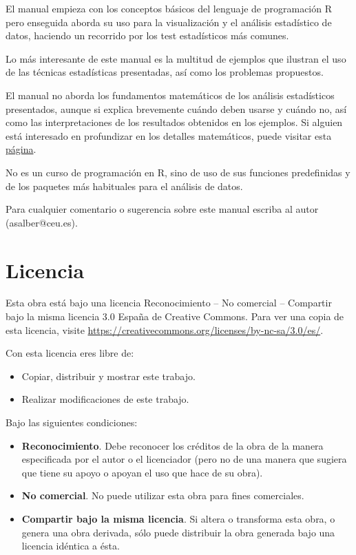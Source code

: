 \documentclass[
  a4paper,
]{scrreport}
\providecommand{\tightlist}{%
  \setlength{\itemsep}{0pt}\setlength{\parskip}{0pt}}\usepackage{longtable,booktabs,array}
\theoremstyle{definition}
\theoremstyle{definition}
\theoremstyle{remark}
\begin{document}
El manual empieza con los conceptos básicos del lenguaje de programación
R pero enseguida aborda su uso para la visualización y el análisis
estadístico de datos, haciendo un recorrido por los test estadísticos
más comunes.

Lo más interesante de este manual es la multitud de ejemplos que
ilustran el uso de las técnicas estadísticas presentadas, así como los
problemas propuestos.

El manual no aborda los fundamentos matemáticos de los análisis
estadísticos presentados, aunque si explica brevemente cuándo deben
usarse y cuándo no, así como las interpretaciones de los resultados
obtenidos en los ejemplos. Si alguien está interesado en profundizar en
los detalles matemáticos, puede visitar esta
\href{https://aprendeconalf.es/docencia/estadistica/}{página}.

No es un curso de programación en R, sino de uso de sus funciones
predefinidas y de los paquetes más habituales para el análisis de datos.

Para cualquier comentario o sugerencia sobre este manual escriba al
autor (asalber@ceu.es).

\section*{Licencia}\label{licencia}


Esta obra está bajo una licencia Reconocimiento -- No comercial --
Compartir bajo la misma licencia 3.0 España de Creative Commons. Para
ver una copia de esta licencia, visite
\url{https://creativecommons.org/licenses/by-nc-sa/3.0/es/}.

Con esta licencia eres libre de:

\begin{itemize}
\tightlist
\item
  Copiar, distribuir y mostrar este trabajo.
\item
  Realizar modificaciones de este trabajo.
\end{itemize}

Bajo las siguientes condiciones:

\begin{itemize}
\item
  \textbf{Reconocimiento}. Debe reconocer los créditos de la obra de la
  manera especificada por el autor o el licenciador (pero no de una
  manera que sugiera que tiene su apoyo o apoyan el uso que hace de su
  obra).
\item
  \textbf{No comercial}. No puede utilizar esta obra para fines
  comerciales.
\item
  \textbf{Compartir bajo la misma licencia}. Si altera o transforma esta
  obra, o genera una obra derivada, sólo puede distribuir la obra
  generada bajo una licencia idéntica a ésta.
\end{itemize}
\end{document}
